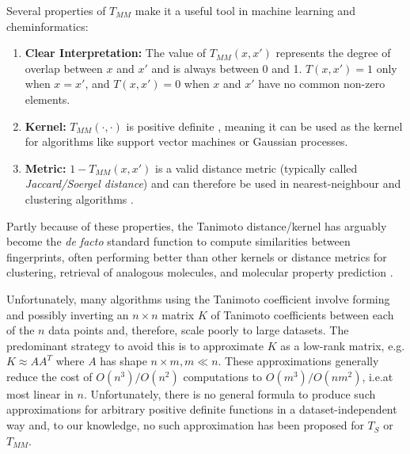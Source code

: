 \documentclass{article}
\theoremstyle{plain}
\theoremstyle{definition}
\theoremstyle{remark}
\begin{document}
Several properties of $T_{MM}$ make it a useful tool in machine learning and cheminformatics:
\begin{enumerate}
    \item \textbf{Clear Interpretation:}
    The value of $T_{MM}(x,x')$ represents the degree of overlap between $x$ and $x'$
    and is always between 0 and 1.
    $T(x,x')=1$ only when $x=x'$,
    and $T(x,x')=0$ when $x$ and $x'$ have no common non-zero elements.
    \item \textbf{Kernel:}
    $T_{MM}(\cdot,\cdot)$ is positive definite \citep{gower1971general,ralaivola2005graph},
    meaning it can be used as the kernel for algorithms like support vector machines or Gaussian processes.
    \item \textbf{Metric:}
    $1-T_{MM}(x,x')$ is a valid distance metric (typically called \emph{Jaccard/Soergel distance})
    and can therefore be used in nearest-neighbour and clustering algorithms \citep{marczewski1958certain,levandowsky1971distance}.
\end{enumerate}

Partly because of these properties, the Tanimoto distance/kernel has arguably become the \textit{de facto} standard
function to compute similarities between fingerprints,
often performing better than other kernels or distance metrics
for clustering, retrieval of analogous molecules, and molecular property prediction
\citep{bajusz2015tanimoto, dunn2021diversity, miranda2021differential, shang2017hybridsim, o2016comparing}.

Unfortunately, many algorithms using the Tanimoto coefficient 
involve forming and possibly inverting an $n\times n$ matrix $K$
of Tanimoto coefficients between each of the $n$ data points
and, therefore, scale poorly to large datasets.
The predominant strategy to avoid this is to approximate $K$
as a low-rank matrix, e.g.\@ $K\approx AA^T$ where $A$
has shape $n\times m,m\ll n$.
These approximations generally reduce the cost of $O(n^3)/O(n^2)$ computations to $O(m^3)/O(nm^2)$,
i.e.\@ at most linear in $n$.
Unfortunately, there is no general formula to produce such approximations
for arbitrary positive definite functions in a dataset-independent way
and, to our knowledge, no such approximation has been proposed for $T_S$ or $T_{MM}$.
\end{document}

